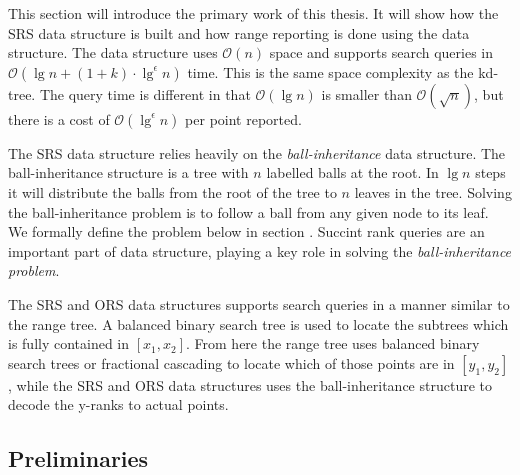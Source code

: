 This section will introduce the primary work of this thesis. It will show how the SRS data structure is built and how range reporting is done using the data structure. The data structure uses $\mathcal{O}(n)$ space and supports search queries in $\mathcal{O}(\lg n + (1+k)\cdot \lg^\epsilon n)$ time. This is the same space complexity as the kd-tree. The query time is different in that $\mathcal{O}(\lg n)$ is smaller than $\mathcal{O}(\sqrt{n})$, but there is a cost of $\mathcal{O}(\lg^\epsilon n)$ per point reported. 

The SRS data structure relies heavily on the \emph{ball-inheritance} data structure. The ball-inheritance structure is a tree with $n$ labelled balls at the root. In $\lg n$ steps it will distribute the balls from the root of the tree to $n$ leaves in the tree. Solving the ball-inheritance problem is to follow a ball from any given node to its leaf. We formally define the problem below in section . Succint rank queries are an important part of data structure, playing a key role in solving the \emph{ball-inheritance problem}.

The SRS and ORS data structures supports search queries in a manner similar to the range tree. A balanced binary search tree is used to locate the subtrees which is fully contained in $[x_1, x_2]$. From here the range tree uses balanced binary search trees or fractional cascading to locate which of those points are in $[y_1, y_2]$, while the SRS and ORS data structures uses the ball-inheritance structure to decode the y-ranks to actual points.


\subsection{Preliminaries}

